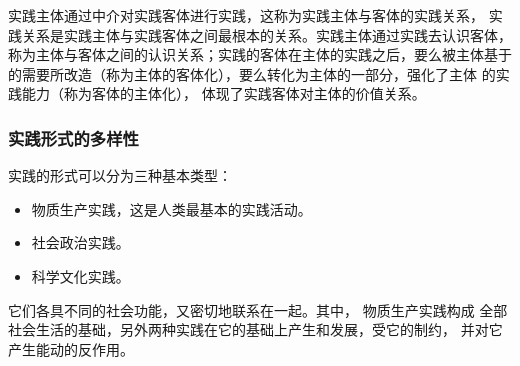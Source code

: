 \documentclass[utf-8, 10pt]{article}
\begin{document}
实践主体通过中介对实践客体进行实践，这称为实践主体与客体的实践关系，
实践关系是实践主体与实践客体之间最根本的关系。实践主体通过实践去认识客体，
称为主体与客体之间的认识关系；实践的客体在主体的实践之后，要么{\kaishu 被主体基于
的需要所改造}（称为主体的客体化），要么{\kaishu 转化为主体的一部分，强化了主体
的实践能力}（称为客体的主体化），
体现了实践客体对主体的价值关系。

\subsubsection{实践形式的多样性}

实践的形式可以分为三种基本类型：
\begin{itemize}[itemsep=0pt]
    \item {\kaishu 物质生产实践}，这是人类最基本的实践活动。
    \item {\kaishu 社会政治实践}。
    \item {\kaishu 科学文化实践}。
\end{itemize}
它们各具不同的社会功能，又密切地联系在一起。其中，{\color{red} 物质生产实践构成
全部社会生活的基础}，另外两种实践在它的基础上产生和发展，受它的制约，
并对它产生能动的反作用。

\end{document}
